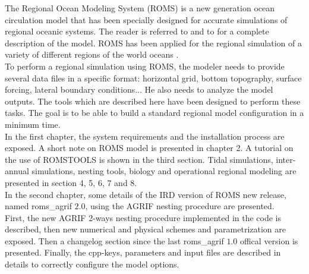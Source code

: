 

The Regional Ocean Modeling System (ROMS) is a new generation ocean circulation model
\citep{Shc03b} that has been specially designed for accurate simulations of regional
oceanic systems.  The reader is referred to \citet{Shc03a} and to \citet{Shc03b} for
a complete description of the model.  ROMS has been applied for the regional
simulation of a variety of different regions of the world oceans
\citep[e.g.][]{Bla02,Dil03,Hai00,Mac02,Mar03,Pen01}. \\

To perform a regional simulation using ROMS, the modeler needs to provide several
data files in a specific format: horizontal grid, bottom topography, surface forcing,
lateral boundary conditions... He also needs to analyze the model outputs. The tools
which are described here have been designed to perform these tasks.  The goal is to
be able to build a standard regional model configuration in a minimum time. \\

In the first chapter, the system requirements and the installation process are
exposed. A short note on ROMS model is presented in chapter 2. A tutorial on the use
of ROMSTOOLS is shown in the third section. Tidal simulations, inter-annual
simulations, nesting tools, biology and operational regional modeling are presented
in section 4,
5, 6, 7 and 8. \\

In the second chapter, some details of the IRD version of ROMS new release, named
roms\_agrif $2.0$, using the AGRIF nesting procedure are presented. \\
First, the new AGRIF 2-ways nesting procedure implemented in the code is described,
then new numerical and physical schemes and parametrization are exposed. Then a
changelog section since the last roms\_agrif $1.0$ offical version is presented.
Finally, the cpp-keys, parameters and input files are described in details to
correctly configure the model options.


